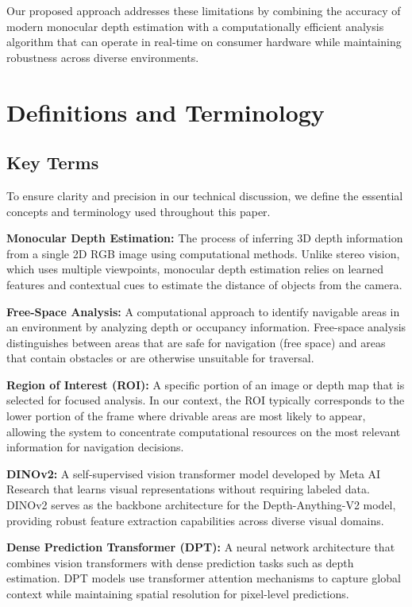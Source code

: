 \documentclass[conference]{IEEEtran}
\begin{document}
Our proposed approach addresses these limitations by combining the accuracy of modern monocular depth estimation with a computationally efficient analysis algorithm that can operate in real-time on consumer hardware while maintaining robustness across diverse environments.

\section{Definitions and Terminology}

\subsection{Key Terms}
To ensure clarity and precision in our technical discussion, we define the essential concepts and terminology used throughout this paper.

\textbf{Monocular Depth Estimation:} The process of inferring 3D depth information from a single 2D RGB image using computational methods. Unlike stereo vision, which uses multiple viewpoints, monocular depth estimation relies on learned features and contextual cues to estimate the distance of objects from the camera.

\textbf{Free-Space Analysis:} A computational approach to identify navigable areas in an environment by analyzing depth or occupancy information. Free-space analysis distinguishes between areas that are safe for navigation (free space) and areas that contain obstacles or are otherwise unsuitable for traversal.

\textbf{Region of Interest (ROI):} A specific portion of an image or depth map that is selected for focused analysis. In our context, the ROI typically corresponds to the lower portion of the frame where drivable areas are most likely to appear, allowing the system to concentrate computational resources on the most relevant information for navigation decisions.

\textbf{DINOv2:} A self-supervised vision transformer model developed by Meta AI Research that learns visual representations without requiring labeled data. DINOv2 serves as the backbone architecture for the Depth-Anything-V2 model, providing robust feature extraction capabilities across diverse visual domains.

\textbf{Dense Prediction Transformer (DPT):} A neural network architecture that combines vision transformers with dense prediction tasks such as depth estimation. DPT models use transformer attention mechanisms to capture global context while maintaining spatial resolution for pixel-level predictions.
\end{document}
